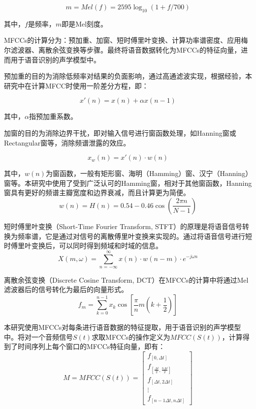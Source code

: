 \documentclass[lang=cn,cite=super]{elegantpaper}
\begin{document}
\begin{equation}
    m = Mel(f) = 2595 \log_{10}(1+f/700)
\end{equation}

其中，$f$是频率，$m$即是Mel刻度。

MFCCs的计算分为：预加重、加窗、短时傅里叶变换、计算功率谱密度、应用梅尔滤波器、离散余弦变换等步骤。最终将语音数据转化为MFCCs的特征向量，进而用于语音识别的声学模型中。

预加重的目的为消除低频率对结果的负面影响，通过高通滤波实现，根据经验，本研究中在计算MFCC时使用一阶差分方程，即：

\begin{equation}
    x'(n) = x(n) + \alpha x(n-1) 
\end{equation}

其中，$\alpha$指预加重系数。

加窗的目的为消除边界干扰，即对输入信号进行窗函数处理，如Hanning窗或Rectangular窗等，消除频谱泄露的效应。

\begin{equation}
    x_w(n) = x'(n) \cdot w(n)
\end{equation}

其中，$w(n)$为窗函数，一般有矩形窗、海明（Hamming）窗、汉宁（Hanning）窗等。本研究中使用了受到广泛认可的Hamming窗，相对于其他窗函数，Hanning窗具有更好的频谱主瓣宽度和边界衰减，而且计算更为简便。
\begin{equation}
    w(n) = H(n) = 0.54 - 0.46 \cos \left( \frac{2\pi n}{N-1} \right)
\end{equation}

短时傅里叶变换（Short-Time Fourier Transform, STFT）的原理是将语音信号转换为频率谱，它是通过对信号的离散傅里叶变换来实现的。通过将语音信号进行短时傅里叶变换后，可以同时得到频域和时域的信息。
\begin{equation}
    X(m, \omega) = \sum_{n=-\infty}^{\infty} x(n) \cdot w(n-m) \cdot e^{-j\omega n}
\end{equation}

离散余弦变换（Discrete Cosine Transform, DCT）在MFCCs的计算中将通过Mel滤波器后的信号转化为最后的向量形式。
\begin{equation}
    f_m = \sum_{k=0}^{n-1} x_k \cos [\frac{\pi}{n}m(k+\frac{1}{2})]
\end{equation}

本研究使用MFCCs对每条进行语音数据的特征提取，用于语音识别的声学模型中。将对一个音频信号$S(t)$求取MFCCs的操作定义为${MFCC}(S(t))$，计算得到了时间序列上每个窗口的MFCCs特征向量，即有：
\begin{equation}
    M = MFCC(S(t)) = 
    \begin{bmatrix}
        f_{[0,\Delta t]}\\
        f_{[\frac{\Delta t}{2},\frac{3\Delta t}{2}]}\\
        f_{[\Delta t,2\Delta t]}\\
        \vdots\\
        f_{[n-1\Delta t,n\Delta t]}
    \end{bmatrix}
\end{equation}
\end{document}
